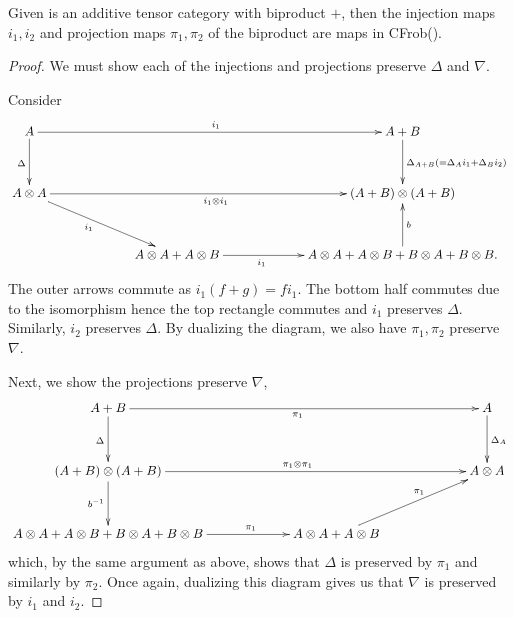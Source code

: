 \begin{lemma}\label{lem:biproduct-injections-and-projections-are-in-cfrob}
  Given \X is an additive tensor category with biproduct $+$, then the injection maps $i_1,i_2$ and
  projection maps $\pi_1,\pi_2$ of the biproduct are maps in CFrob(\X).
\end{lemma}
\begin{proof}
  We  must show each of the injections and projections preserve $\Delta$ and $\nabla$.

  Consider
  \[
     \xymatrix@C+40pt@R+10pt{
       A \ar[d]_{\Delta} \ar[rr]^{i_1} & &A+B \ar[d]^{\Delta_{A+B}(=\Delta_A i_1 + \Delta_B i_2)}\\
       A\*A \ar[rr]_{i_1\*i_1} \ar[dr]_(.425){i_1} & & (A+B)\*(A+B)\\
       &A\*A+A\*B \ar[r]_(.375){i_1} & A\*A+A\*B+B\*A+B\*B \ar[u]_{b}.
     }
  \]
  The outer arrows commute as $i_1(f+g) = f i_1$. The bottom half commutes due to the isomorphism
  hence the top rectangle commutes and $i_1$ preserves $\Delta$.  Similarly, $i_2$ preserves
  $\Delta$. By dualizing the diagram, we also have $\pi_1, \pi_2$ preserve $\nabla$.

  Next, we show the projections preserve $\nabla$,
  \[
    \xymatrix@C+40pt@R+10pt{
       A+B \ar[rr]_{\pi_1}\ar[d]_{\Delta}& & A\ar[d]^{\Delta_A}\\
        (A+B)\*(A+B)  \ar[rr]^{\pi_1\*\pi_1} \ar[d]_{b^{-1}}  & &A\*A\\
       {A\*A+A\*B+B\*A+B\*B}  \ar[r]^(.625){\pi_1}  &A\*A+A\*B \ar[ur]^(.575){\pi_1}
     }
  \]
  which, by the same argument as above, shows that $\Delta$ is preserved by $\pi_1$ and similarly by
  $\pi_2$. Once again, dualizing  this diagram gives us that $\nabla$ is preserved by $i_1$ and $i_2$.
\end{proof}

